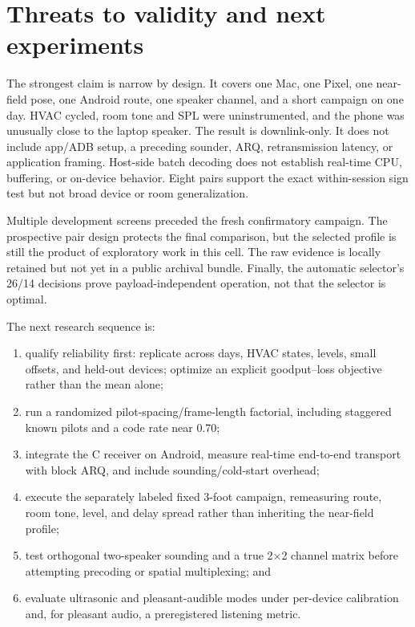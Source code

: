 \documentclass[11pt]{article}
\begin{document}
\section{Threats to validity and next experiments}
\label{sec:limits}

The strongest claim is narrow by design. It covers one Mac, one Pixel, one
near-field pose, one Android route, one speaker channel, and a short campaign
on one day. HVAC cycled, room tone and SPL were uninstrumented, and the phone
was unusually close to the laptop speaker. The result is downlink-only. It
does not include app/ADB setup, a preceding sounder, ARQ, retransmission
latency, or application framing. Host-side batch decoding does not establish
real-time CPU, buffering, or on-device behavior. Eight pairs support the exact
within-session sign test but not broad device or room generalization.

Multiple development screens preceded the fresh confirmatory campaign. The
prospective pair design protects the final comparison, but the selected
profile is still the product of exploratory work in this cell. The raw
evidence is locally retained but not yet in a public archival bundle. Finally,
the automatic selector's 26/14 decisions prove payload-independent operation,
not that the selector is optimal.

The next research sequence is:
\begin{enumerate}
  \item qualify reliability first: replicate across days, HVAC states, levels,
        small offsets, and held-out devices; optimize an explicit goodput--loss
        objective rather than the mean alone;
  \item run a randomized pilot-spacing/frame-length factorial, including
        staggered known pilots and a code rate near 0.70;
  \item integrate the C receiver on Android, measure real-time end-to-end
        transport with block ARQ, and include sounding/cold-start overhead;
  \item execute the separately labeled fixed 3-foot campaign, remeasuring
        route, room tone, level, and delay spread rather than inheriting the
        near-field profile;
  \item test orthogonal two-speaker sounding and a true 2$\times$2 channel
        matrix before attempting precoding or spatial multiplexing; and
  \item evaluate ultrasonic and pleasant-audible modes under per-device
        calibration and, for pleasant audio, a preregistered listening metric.
\end{enumerate}
\end{document}
